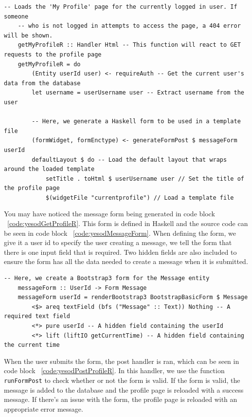 
\begin{lstlisting}[caption={GET request handler for current profile page},label={code:yesodGetProfileR}]
	-- Loads the 'My Profile' page for the currently logged in user. If someone
	-- who is not logged in attempts to access the page, a 404 error will be shown.
	getMyProfileR :: Handler Html -- This function will react to GET requests to the profile page
	getMyProfileR = do
		(Entity userId user) <- requireAuth -- Get the current user's data from the database
		let username = userUsername user -- Extract username from the user
	
		-- Here, we generate a Haskell form to be used in a template file
		(formWidget, formEnctype) <- generateFormPost $ messageForm userId
		defaultLayout $ do -- Load the default layout that wraps around the loaded template
			setTitle . toHtml $ userUsername user // Set the title of the profile page
			$(widgetFile "currentprofile") // Load a template file
\end{lstlisting}

You may have noticed the message form being generated in code block ~\ref{code:yesodGetProfileR}.
This form is defined in Haskell and the source code can be seen in code block ~\ref{code:yesodMessageForm}.
When defining the form, we give it a user id to specify the user creating a message, 
we tell the form that there is one input field that is required. Two hidden fields
are also included to ensure the form has all the data needed to create a message
when it is submitted.

\begin{lstlisting}[caption={The message form},label={code:yesodMessageForm}]
	-- Here, we create a Bootstrap3 form for the Message entity
	messageForm :: UserId -> Form Message
	messageForm userId = renderBootstrap3 BootstrapBasicForm $ Message
		<$> areq textField (bfs ("Message" :: Text)) Nothing -- A required text field
		<*> pure userId -- A hidden field containing the userId
		<*> lift (liftIO getCurrentTime) -- A hidden field containing the current time
\end{lstlisting}

When the user submits the form, the post handler is ran, which can be seen in code block
~\ref{code:yesodPostProfileR}. In this handler, we use the function \texttt{runFormPost}
to check whether or not the form is valid. If the form is valid, the message is added
to the database and the profile page is reloaded with a success message. If there's an
issue with the form, the profile page is reloaded with an appropriate error message.

